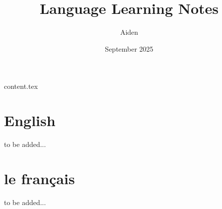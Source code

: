 \documentclass{book}
\begin{document}
\setcounter{tocdepth}{3}

\frontmatter

\title{Language Learning Notes}
\author{Aiden}
\date{September 2025}
\maketitle

\tableofcontents


\mainmatter

\part{}

{content.tex}


\part{English}

to be added...

\part{le français}

to be added...


\backmatter
\end{document}
